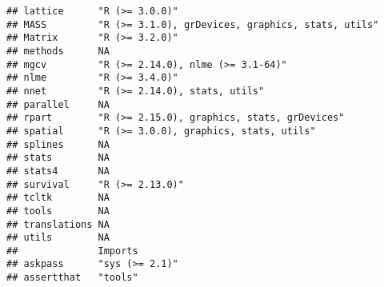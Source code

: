 \documentclass[]{article}
\begin{document}
\begin{verbatim}
## lattice      "R (>= 3.0.0)"                                   
## MASS         "R (>= 3.1.0), grDevices, graphics, stats, utils"
## Matrix       "R (>= 3.2.0)"                                   
## methods      NA                                               
## mgcv         "R (>= 2.14.0), nlme (>= 3.1-64)"                
## nlme         "R (>= 3.4.0)"                                   
## nnet         "R (>= 2.14.0), stats, utils"                    
## parallel     NA                                               
## rpart        "R (>= 2.15.0), graphics, stats, grDevices"      
## spatial      "R (>= 3.0.0), graphics, stats, utils"           
## splines      NA                                               
## stats        NA                                               
## stats4       NA                                               
## survival     "R (>= 2.13.0)"                                  
## tcltk        NA                                               
## tools        NA                                               
## translations NA                                               
## utils        NA                                               
##              Imports                                                                                                                                                                                                                                                                                                                                                                                                                                                                               
## askpass      "sys (>= 2.1)"                                                                                                                                                                                                                                                                                                                                                                                                                                                                        
## assertthat   "tools"                                                                                                                                                                                                                                                                                                                                                                                                                                                                               

\end{verbatim}
\end{document}
